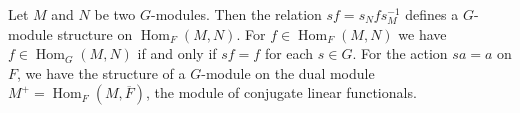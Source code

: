 Let $M$ and $N$ be two $G$-modules. Then the relation $sf = s_N f s_M^{-1}$ defines a $G$-module structure on $\operatorname{Hom}_F(M, N)$. For $f \in \operatorname{Hom}_F(M, N)$ we have $f \in \operatorname{Hom}_G(M, N)$ if and only if $sf = f$ for each $s \in G$. For the action $sa = a$ on $F$, we have the structure of a $G$-module on the dual module $M^+ = \operatorname{Hom}_F(M, \overline{F})$, the module of conjugate linear functionals.
